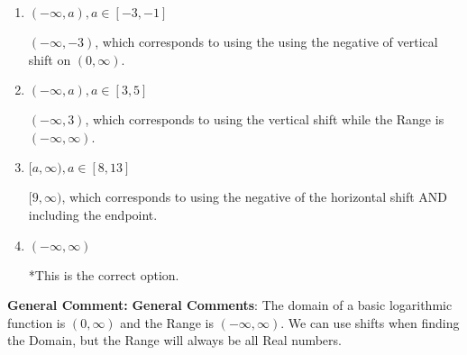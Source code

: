 \documentclass{extbook}[14pt]
\begin{document}
\begin{enumerate}
{\begin{enumerate}[label=\Alph*.]
$[3, \infty)$, which corresponds to using the flipped Domain AND including the endpoint.
\item \( (-\infty, a), a \in [-3, -1] \)

$(-\infty, -3)$, which corresponds to using the using the negative of vertical shift on $(0, \infty)$.
\item \( (-\infty, a), a \in [3, 5] \)

$(-\infty, 3)$, which corresponds to using the vertical shift while the Range is $(-\infty, \infty)$.
\item \( [a, \infty), a \in [8, 13] \)

$[9, \infty)$, which corresponds to using the negative of the horizontal shift AND including the endpoint.
\item \( (-\infty, \infty) \)

*This is the correct option.
\end{enumerate}

\textbf{General Comment:} \textbf{General Comments}: The domain of a basic logarithmic function is $(0, \infty)$ and the Range is $(-\infty, \infty)$. We can use shifts when finding the Domain, but the Range will always be all Real numbers.
}
\end{enumerate}
\end{document}
